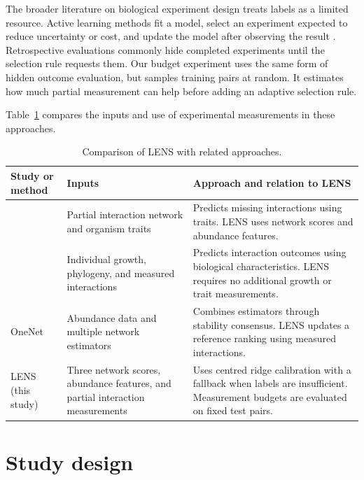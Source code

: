 \documentclass[11pt]{article}
\begin{document}
The broader literature on biological experiment design treats labels as a limited resource.
Active learning methods fit a model, select an experiment expected to reduce uncertainty or cost, and update the model after observing the result \citep{sverchkov2017active}.
Retrospective evaluations commonly hide completed experiments until the selection rule requests them.
Our budget experiment uses the same form of hidden outcome evaluation, but samples training pairs at random.
It estimates how much partial measurement can help before adding an adaptive selection rule.

Table~\ref{tab:related-approaches} compares the inputs and use of experimental measurements in these approaches.

\begin{table}[!t]
\centering
\caption{Comparison of LENS with related approaches.}
\label{tab:related-approaches}
\small
\setlength{\tabcolsep}{4pt}
\renewcommand{\arraystretch}{1.15}
\begin{tabularx}{\textwidth}{@{}>{\raggedright\arraybackslash}p{}>{\raggedright\arraybackslash}p{}>{\raggedright\arraybackslash}X@{}}
\toprule
Study or method & Inputs & Approach and relation to LENS \\
\midrule
\citet{dimucci2018missing} & Partial interaction network and organism traits & Predicts missing interactions using traits. LENS uses network scores and abundance features. \\
\addlinespace
\citet{nestor2023growth} & Individual growth, phylogeny, and measured interactions & Predicts interaction outcomes using biological characteristics. LENS requires no additional growth or trait measurements. \\
\addlinespace
OneNet \citep{champion2024onenet} & Abundance data and multiple network estimators & Combines estimators through stability consensus. LENS updates a reference ranking using measured interactions. \\
\addlinespace
LENS (this study) & Three network scores, abundance features, and partial interaction measurements & Uses centred ridge calibration with a fallback when labels are insufficient. Measurement budgets are evaluated on fixed test pairs. \\
\bottomrule
\end{tabularx}
\end{table}

\section{Study design}
\end{document}
